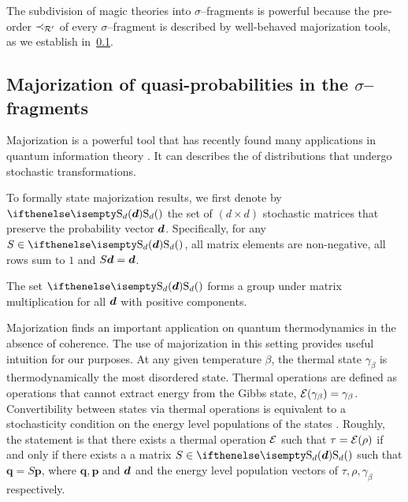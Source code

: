\documentclass[pra,
aps,
twocolumn,
superscriptaddress,
groupedaddress,
nofootinbib,
reprint
]{revtex4-1}
\begin{document}
The subdivision of magic theories into $\sigma$--fragments is powerful because the pre-order $\prec_{\mathcal{R}'}$ of every $\sigma$--fragment is described by well-behaved majorization tools, as we establish in~\cref{sec:major}. 

\subsection{Majorization of quasi-probabilities in the $\sigma$--fragments}\label{sec:major}

Majorization is a powerful tool that has recently found many applications in quantum information theory .
It can describes the  of distributions that undergo stochastic transformations.

To formally state majorization results, we first denote by $\stoch$ the set of $(d \times d)$ stochastic matrices that preserve the probability vector $\bm{d}$. 
Specifically, for any $S \in \stoch$, all matrix elements are non-negative, all rows sum to $1$ and $S\bm{d} = \bm{d}$.

The set $\stoch$ forms a group under matrix multiplication for all $\bm{d}$ with positive components.

Majorization finds an important application on quantum thermodynamics in the absence of coherence.
The use of majorization in this setting provides useful intuition for our purposes.
At any given temperature $\beta$, the thermal state $\gamma_\beta$ is thermodynamically the most disordered state. 
Thermal operations are defined as operations that cannot extract energy from the Gibbs state, $\mathcal{E}(\gamma_\beta) = \gamma_\beta$.
Convertibility between states via thermal operations is equivalent to a stochasticity condition on the energy level populations of the states .
Roughly, the statement is that there exists a thermal operation $\mathcal{E}$ such that $\tau = \mathcal{E}(\rho)$ if and only if there exists a a matrix $S \in \stoch$ such that $\bm{q} = S\bm{p}$, where $\bm{q}, \bm{p}$ and $\bm{d}$ and the energy level population vectors of $\tau, \rho, \gamma_\beta$ respectively.
\end{document}
